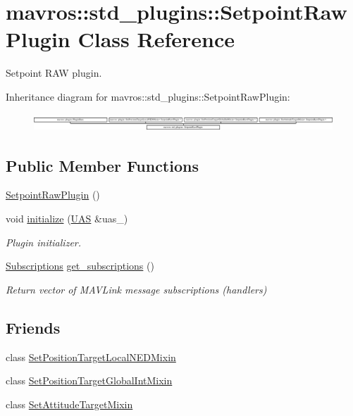 \hypertarget{classmavros_1_1std__plugins_1_1SetpointRawPlugin}{}\section{mavros\+::std\+\_\+plugins\+::Setpoint\+Raw\+Plugin Class Reference}
\label{classmavros_1_1std__plugins_1_1SetpointRawPlugin}


Setpoint R\+AW plugin.  


Inheritance diagram for mavros\+::std\+\_\+plugins\+::Setpoint\+Raw\+Plugin\+:\begin{figure}[H]
\begin{center}
\leavevmode
\includegraphics[height=0.666667cm]{classmavros_1_1std__plugins_1_1SetpointRawPlugin}
\end{center}
\end{figure}
\subsection*{Public Member Functions}
\begin{DoxyCompactItemize}
\item 
\mbox{\hyperlink{group__plugin_ga6963f8398466a36a1ecd8669d8bd315c}{Setpoint\+Raw\+Plugin}} ()
\item 
void \mbox{\hyperlink{group__plugin_gaf4feaba098393f1b9f496e7ab47781a3}{initialize}} (\mbox{\hyperlink{classmavros_1_1UAS}{U\+AS}} \&uas\+\_\+)
\begin{DoxyCompactList}\small\item\em Plugin initializer. \end{DoxyCompactList}\item 
\mbox{\hyperlink{group__plugin_ga8967d61fc77040e0c3ea5a4585d62a09}{Subscriptions}} \mbox{\hyperlink{group__plugin_ga7010ce8f4de96dae39a8dd9a0de4246e}{get\+\_\+subscriptions}} ()
\begin{DoxyCompactList}\small\item\em Return vector of M\+A\+V\+Link message subscriptions (handlers) \end{DoxyCompactList}\end{DoxyCompactItemize}
\subsection*{Friends}
\begin{DoxyCompactItemize}
\item 
class \mbox{\hyperlink{group__plugin_gac6cc7d4f0f89ffc59d03574a47983861}{Set\+Position\+Target\+Local\+N\+E\+D\+Mixin}}
\item 
class \mbox{\hyperlink{group__plugin_gab083ddfdc076ca82665c4059a112494d}{Set\+Position\+Target\+Global\+Int\+Mixin}}
\item 
class \mbox{\hyperlink{group__plugin_ga1d68f99fc6ccc3d89d32bd54885749f7}{Set\+Attitude\+Target\+Mixin}}
\end{DoxyCompactItemize}
